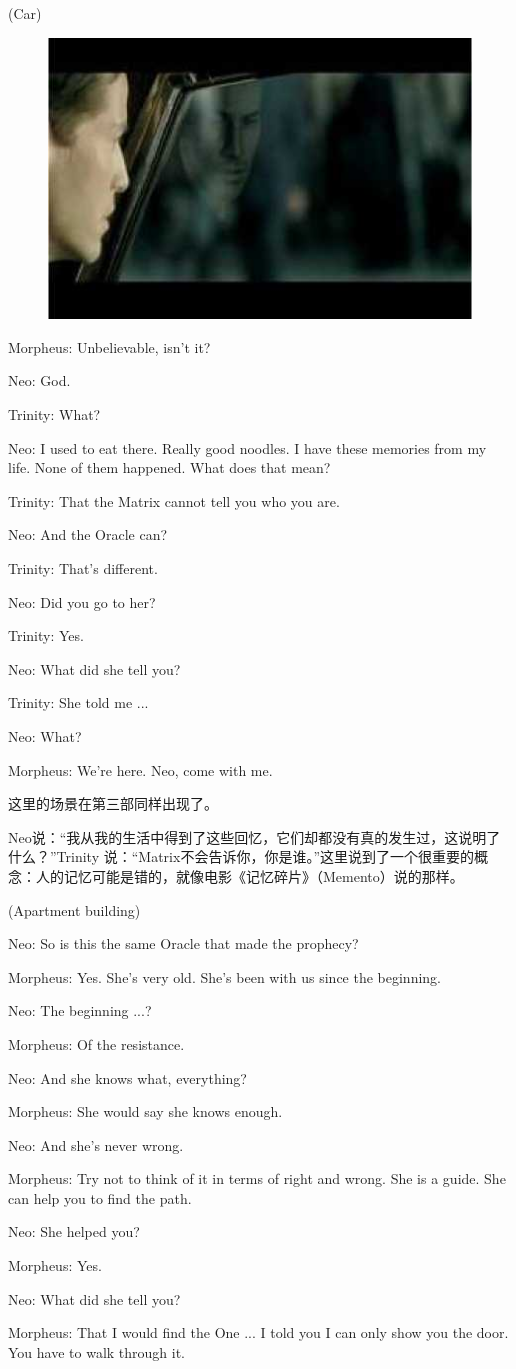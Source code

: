 \documentclass[UTF8]{ctexart}
\newenvironment{myquote}{\color{green} \setlength{\leftskip}{6em} \setlength{\rightskip}{4em} \setlength{\parindent}{-2em}}{\par}
\begin{document}
\begin{myquote}
(Car)

\begin{figure}[htb]
\centering
\includegraphics[width=0.5\linewidth]{fig/read_Matrix-42}
\end{figure}

Morpheus: Unbelievable, isn't it?

Neo: God.

Trinity: What?

Neo: I used to eat there. Really good noodles. I have these memories from my life. None of them happened. What does that mean?

Trinity: That the Matrix cannot tell you who you are.

Neo: And the Oracle can?

Trinity: That's different.

Neo: Did you go to her?

Trinity: Yes.

Neo: What did she tell you?

Trinity: She told me ...

Neo: What?

Morpheus: We're here. Neo, come with me.
\end{myquote}

这里的场景在第三部同样出现了。

Neo说：“我从我的生活中得到了这些回忆，它们却都没有真的发生过，这说明了什么？”Trinity 说：“Matrix不会告诉你，你是谁。”这里说到了一个很重要的概念：人的记忆可能是错的，就像电影《记忆碎片》（Memento）说的那样。

\begin{myquote}
(Apartment building)

Neo: So is this the same Oracle that made the prophecy?

Morpheus: Yes. She's very old. She's been with us since the beginning.

Neo: The beginning ...?

Morpheus: Of the resistance.

Neo: And she knows what, everything?

Morpheus: She would say she knows enough.

Neo: And she's never wrong.

Morpheus: Try not to think of it in terms of right and wrong. She is a guide. She can help you to find the path.

Neo: She helped you?

Morpheus: Yes.

Neo: What did she tell you?

Morpheus: That I would find the One ... I told you I can only show you the door. You have to walk through it.
\end{myquote}
\end{document}
